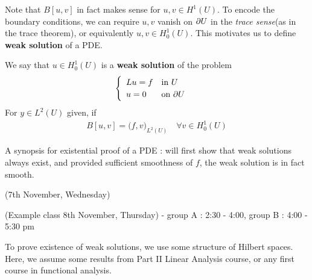 \documentclass[12pt,a4paper]{report}
\begin{document}
Note that $B[u,v]$ in fact makes sense for $u,v\in H^1(U)$. To encode the boundary conditions, we can require $u,v$ vanish on $\partial U$ in the \emph{trace sense}(as in the trace theorem), or equivalently $u,v \in H_0^1(U)$. This motivates us to define \textbf{weak solution} of a PDE.
\s

 We say that $u\in H^1_0(U)$ is a \textbf{weak solution} of the problem
\begin{align*}
\begin{cases}
\begin{array}{ll}
Lu = f & \text{in } U \\
u =0 & \text{on } \partial U
\end{array}
\end{cases}
\end{align*}
For $y\in L^2(U)$ given, if
\begin{align*}
B[u,v] = \big( f,v \big)_{L^2(U)} \quad \forall v\in H_0^1 (U)
\end{align*}
\s

A synopsis for existential proof of a PDE : will first show that weak solutions always exist, and provided sufficient smoothness of $f$, the weak solution is in fact smooth.
\s

\newday

(7th November, Wednesday)
\s

(Example class 8th November, Thursday) - group A : 2:30 - 4:00, group B : 4:00 - 5:30 pm
\s

To prove existence of weak solutions, we use some structure of Hilbert spaces. Here, we assume some results from Part II Linear Analysis course, or any first course in functional analysis.
\s
\end{document}
